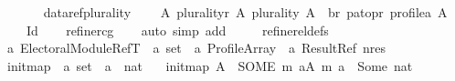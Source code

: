 \begin{isabellebody}
\ \ \ \ \ {\isacharbraceleft}{\kern0pt}{\isacharbraceright}{\kern0pt}{\isacharparenright}{\kern0pt}{\isachardoublequoteclose}\isanewline
\isanewline
{}\isamarkupfalse%
\ datarefplurality{\isacharcolon}{\kern0pt}\isanewline
\ \ \ {\isachardoublequoteopen}{\isasymforall}\ A{\isachardot}{\kern0pt}\ {\isacharparenleft}{\kern0pt}plurality{\isacharunderscore}{\kern0pt}r\ A{\isacharcomma}{\kern0pt}\ plurality\ A{\isacharparenright}{\kern0pt}\ {\isasymin}\ {\isacharparenleft}{\kern0pt}br\ pa{\isacharunderscore}{\kern0pt}to{\isacharunderscore}{\kern0pt}pr\ {\isacharparenleft}{\kern0pt}profile{\isacharunderscore}{\kern0pt}a\ A{\isacharparenright}{\kern0pt}{\isacharparenright}{\kern0pt}\ {\isasymrightarrow}\ \isanewline
\ \ \ \ Id{\isachardoublequoteclose}\isanewline
%
\isadelimproof
\ \ %
\endisadelimproof
%
\isatagproof
{}\isamarkupfalse%
\ {\isacharparenleft}{\kern0pt}refine{\isacharunderscore}{\kern0pt}rcg{\isacharparenright}{\kern0pt}\isanewline
\ \ \isamarkupfalse%
\ {\isacharparenleft}{\kern0pt}auto\ simp\ add{\isacharcolon}{\kern0pt}\ \isanewline
\ \ \ \ refine{\isacharunderscore}{\kern0pt}rel{\isacharunderscore}{\kern0pt}defs{\isacharparenright}{\kern0pt}\ \isanewline
\ \ \isamarkupfalse%
%
\endisatagproof
{\isafoldproof}%
%
\isadelimproof
\isanewline
%
\endisadelimproof
\isanewline
{}\isamarkupfalse%
\ {\isacharprime}{\kern0pt}a\ Electoral{\isacharunderscore}{\kern0pt}Module{\isacharunderscore}{\kern0pt}Ref{\isacharunderscore}{\kern0pt}T\ {\isacharequal}{\kern0pt}\ {\isachardoublequoteopen}{\isacharprime}{\kern0pt}a\ set\ {\isasymRightarrow}\ {\isacharprime}{\kern0pt}a\ Profile{\isacharunderscore}{\kern0pt}Array\ {\isasymRightarrow}\ {\isacharprime}{\kern0pt}a\ Result{\isacharunderscore}{\kern0pt}Ref\ nres{\isachardoublequoteclose}\isanewline
\isanewline
{}\isamarkupfalse%
\ initmap\ {\isacharcolon}{\kern0pt}{\isacharcolon}{\kern0pt}\ {\isachardoublequoteopen}{\isacharprime}{\kern0pt}a\ set\ {\isasymRightarrow}\ {\isacharprime}{\kern0pt}a\ {\isasymrightharpoonup}\ nat{\isachardoublequoteclose}\ \isanewline
\ \ {\isachardoublequoteopen}initmap\ A\ {\isacharequal}{\kern0pt}\ {\isacharparenleft}{\kern0pt}SOME\ m{\isachardot}{\kern0pt}\ {\isacharparenleft}{\kern0pt}{\isasymforall}a{\isasymin}A{\isachardot}{\kern0pt}\ {\isacharparenleft}{\kern0pt}{\isacharparenleft}{\kern0pt}m\ a{\isacharparenright}{\kern0pt}\ {\isacharequal}{\kern0pt}\ Some\ {\isacharparenleft}{\kern0pt}{}{\isacharcolon}{\kern0pt}{\isacharcolon}{\kern0pt}nat{\isacharparenright}{\kern0pt}{\isacharparenright}{\kern0pt}{\isacharparenright}{\kern0pt}{\isacharparenright}{\kern0pt}{\isachardoublequoteclose}\isanewline

\end{isabellebody}
